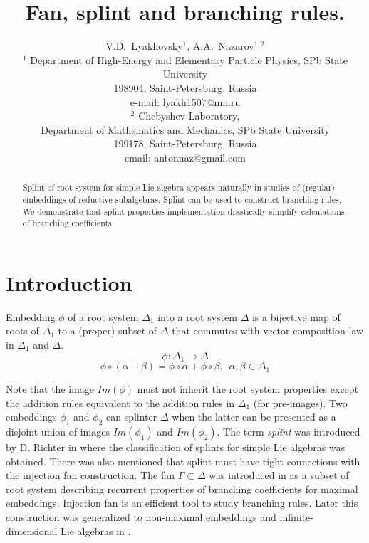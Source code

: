 \documentclass[12pt]{article}
\begin{document}
\title{Fan, splint and branching rules.}



\author{V.D.~Lyakhovsky$^1$, A.A.~Nazarov$^{1,2}$ \\
  {\small $^1$ Department of High-Energy and Elementary Particle Physics, SPb State University}\\
  {\small 198904, Saint-Petersburg, Russia}\\
  {\small e-mail: lyakh1507@nm.ru}\\
  {\small$^{2}$ Chebyshev Laboratory,}\\
  {\small Department of Mathematics and Mechanics, SPb State University}\\
  {\small 199178, Saint-Petersburg, Russia}\\
  {\small email: antonnaz@gmail.com}}
\maketitle

\begin{abstract}
Splint of root system for simple Lie algebra appears naturally in
studies of (regular) embeddings of reductive subalgebras. Splint can
be used to construct branching rules. We demonstrate that 
splint properties implementation drastically simplify calculations of
branching coefficients.
\end{abstract}

\section{Introduction}
\label{sec:Introduction}

Embedding $\phi$ of a root system $\Delta_1$ into a root system
$\Delta$ is a bijective map of roots of $\Delta_{1}$ to a (proper)
subset of $\Delta$ that commutes with vector composition law in
$\Delta_{1}$ and $\Delta$.
\begin{equation*}
\phi:\Delta_1 \longrightarrow \Delta
\end{equation*}
\begin{equation*}
\phi \circ (\alpha + \beta) =\phi \circ \alpha + \phi \circ \beta,
\,\,\, \alpha,\beta \in \Delta_1
\end{equation*}

Note that the image $Im(\phi)$ must not inherit the root system
properties except the addition rules equivalent to the addition
rules in $\Delta_{1}$ (for pre-images). Two embeddings $\phi_1$ and $\phi_2$  
can splinter $\Delta$  when the latter can be presented 
as a disjoint union of images $Im(\phi_1)$ and $Im(\phi_2)$.   
The term {\it splint} was
introduced by D. Richter in  \cite{richter2008splints} where the
classification of splints for simple Lie algebras was obtained.
There was also mentioned that splint must have tight
connections with the injection fan construction. The fan $\Gamma
\subset \Delta$ was
introduced in \cite{lyakhovsky1996rra} as a subset of root system describing recurrent
properties of branching coefficients for maximal embeddings. Injection fan is an
efficient tool to study branching rules. Later this construction
was generalized to non-maximal embeddings and infinite-dimensional
Lie algebras in \cite{2010arXiv1007.0318L, ilyin812pbc}.
\end{document}
